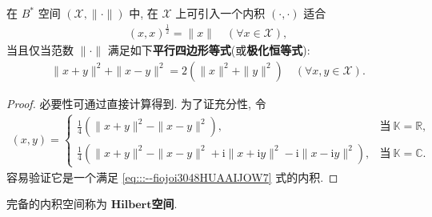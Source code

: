 \documentclass[../../main.tex]{subfiles}%
\begin{document}
\begin{proposition}\label{proposition:平行四边形等式--泛函分析}
在 $B^*$ 空间 $(\mathscr{X},\|\cdot\|)$ 中, 在 $\mathscr{X}$ 上可引入一个内积 $(\cdot,\cdot)$ 适合
\begin{align}
(x,x)^\frac{1}{2}=\|x\|\quad(\forall x\in\mathscr{X}),\label{eq:::--fiojoi3048HUAAIJOW7}
\end{align}
当且仅当范数 $\|\cdot\|$ 满足如下\textbf{平行四边形等式}(或\textbf{极化恒等式}):
\begin{align*}
\|x+y\|^2+\|x-y\|^2=2(\|x\|^2+\|y\|^2)\quad(\forall x,y\in\mathscr{X}).
\end{align*}
\end{proposition}
\begin{proof}

必要性可通过直接计算得到. 为了证充分性, 令
\begin{align*}
(x,y)=
\begin{cases}
\frac{1}{4}\left(\|x+y\|^2-\|x-y\|^2\right), & \text{当}\ \mathbb{K}=\mathbb{R}, \\
\frac{1}{4}\left(\|x+y\|^2-\|x-y\|^2+\mathrm{i}\|x+\mathrm{i}y\|^2-\mathrm{i}\|x-\mathrm{i}y\|^2\right), & \text{当}\ \mathbb{K}=\mathbb{C}.
\end{cases}
\end{align*}
容易验证它是一个满足 \eqref{eq:::--fiojoi3048HUAAIJOW7} 式的内积.

\end{proof}

\begin{definition}
完备的内积空间称为 $\mathbf{Hilbert}$\textbf{空间}.
\end{definition}
\end{document}
